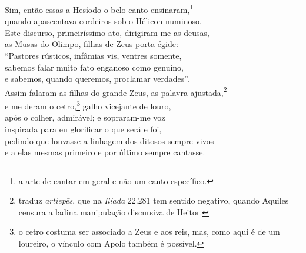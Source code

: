 \quad{}Sim, então essas a Hesíodo o belo canto ensinaram,\footnote{a arte de cantar em geral e não um canto específico.}\\
quando apascentava cordeiros sob o Hélicon numinoso.\\
Este discurso, primeiríssimo ato, dirigiram-me as deusas,\\
as Musas do Olimpo, filhas de Zeus porta-égide: \\
``Pastores rústicos, infâmias vis, ventres somente,\\
sabemos falar muito fato enganoso como genuíno,\\
e sabemos, quando queremos, proclamar verdades''.\\
Assim falaram as filhas do grande Zeus, as palavra-ajustada,\footnote{traduz \emph{artiepēs}, que na \emph{Ilíada}
22.281 tem sentido negativo, quando Aquiles censura a ladina manipulação
discursiva de Heitor.}\\
e me deram o cetro,\footnote{o cetro costuma ser associado a Zeus e aos reis, mas, como aqui é de
um loureiro, o vínculo com Apolo também é possível.} galho vicejante de louro, \\
após o colher, admirável; e sopraram-me voz\\
inspirada para eu glorificar o que será e foi,\\
pedindo que louvasse a linhagem dos ditosos sempre vivos\\
e a elas mesmas primeiro e por último sempre cantasse.

